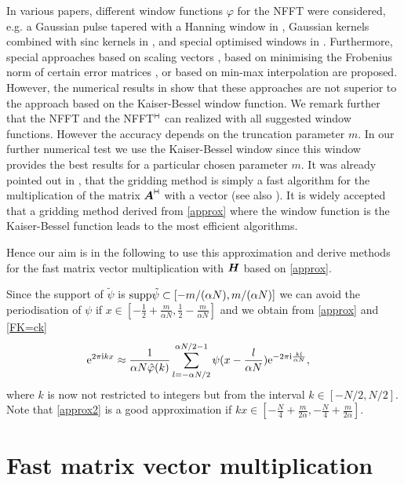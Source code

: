 \documentclass[journal]{IEEEtran}
\def\ti{\mbox{\scriptsize{\rm i}}}
\newcommand{\eip}[1]{{\rm e}^{ 2\pi{\ti} #1}}
\newcommand{\eim}[1]{{\rm e}^{-2\pi{\ti} #1}}
\newcommand{\zb}[1]{\mbox{\boldmath{${#1}$}}}
\newcommand{\adj}{{\vdash \hspace*{-1.72mm} \dashv}}
\numberwithin{equation}{section}
\numberwithin{table}{section}
\numberwithin{figure}{section}
\begin{document}
In various papers, different window functions $\varphi$ for the NFFT
were considered, e.g. 
a Gaussian pulse tapered with a Hanning window in \cite{DuSc}, 
Gaussian kernels combined with sinc kernels in \cite{Pe}, and
special optimised windows in \cite{Ja,DuSc}. 
Furthermore, special approaches based on scaling vectors
\cite{NgLi99}, based on minimising the Frobenius norm of certain error
matrices \cite{st01}, or based on min-max interpolation \cite{fesu02} are
proposed. However, the numerical results in \cite{four, st01, fesu02} show that
these approaches are not superior to the approach based on the Kaiser-Bessel
window function.
We remark further that the NFFT and the NFFT$^{\adj}$ can realized
with all suggested window functions. However the accuracy depends on
the truncation parameter $m$. In our further numerical test we use the
Kaiser-Bessel window since this window provides the best results for a
particular chosen parameter $m$.
It was already pointed out in \cite{postta01,SaBeCo01},
that the gridding 
method is simply a fast algorithm for the multiplication of the matrix
$\zb A^{\adj}$ with a vector (see also \cite{KnKuPo}).
It is widely accepted that a gridding method derived from
\eqref{approx} where the window function is the Kaiser-Bessel function
leads to the most efficient algorithms. 

Hence our aim is in the following to use this approximation and derive
methods for the fast matrix vector multiplication with $\zb H$ based
on \eqref{approx}. 

Since the support of $\tilde\psi$ is ${\rm supp} \tilde\psi\subset
[-m/(\alpha N), m/(\alpha N)]$ we can avoid the periodisation of $\psi$ 
if $x\in[-\frac{1}{2}+\frac{m}{\alpha N},\frac{1}{2}-\frac{m}{\alpha N}]$ 
and we obtain from \eqref{approx} and \eqref{FK=ck}
\begin{equation} \label{approx2}
\eip{kx}
\approx
\frac{1}{\alpha N \hat\varphi(k)}
\sum_{l=-\alpha N/2}^{\alpha N/2-1} \psi (x-\frac{l}{\alpha N})
\eim{\frac{kl}{\alpha N}},\quad
\end{equation}
where $k$ is now not restricted to integers but from the interval
$k\in [-N/2,N/2]$.
Note that \eqref{approx2} is a good approximation if 
$kx\in[-\frac{N}{4}+\frac{m}{2\alpha},-\frac{N}{4}+\frac{m}{2\alpha}]$.


\section{Fast matrix vector multiplication}\label{Sec:H}
 
\end{document}
